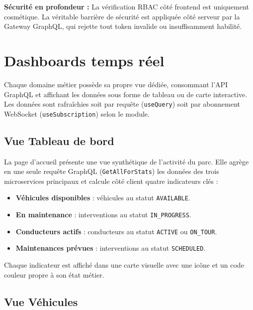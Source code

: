 \documentclass[12pt,a4paper]{article}
\begin{document}
\begin{infobox}
\textbf{S\'{e}curit\'{e} en profondeur :} La v\'{e}rification RBAC c\^{o}t\'{e} frontend est uniquement cosmétique. La v\'{e}ritable barrière de s\'{e}curit\'{e} est appliqu\'{e}e c\^{o}t\'{e} serveur par la Gateway GraphQL, qui rejette tout token invalide ou insuffisamment habilit\'{e}.
\end{infobox}

\section{Dashboards temps r\'{e}el}

Chaque domaine m\'{e}tier poss\`{e}de sa propre vue d\'{e}di\'{e}e, consommant l'API GraphQL et affichant les donn\'{e}es sous forme de tableau ou de carte interactive. Les donn\'{e}es sont rafra\^{i}chies soit par requ\^{e}te (\texttt{useQuery}) soit par abonnement WebSocket (\texttt{useSubscription}) selon le module.

\subsection{Vue Tableau de bord}

La page d'accueil pr\'{e}sente une vue synth\'{e}tique de l'activit\'{e} du parc. Elle agr\`{e}ge en une seule requ\^{e}te GraphQL (\texttt{GetAllForStats}) les donn\'{e}es des trois microservices principaux et calcule c\^{o}t\'{e} client quatre indicateurs cl\'{e}s :

\begin{itemize}[leftmargin=*]
  \item \textbf{V\'{e}hicules disponibles} : v\'{e}hicules au statut \texttt{AVAILABLE}.
  \item \textbf{En maintenance} : interventions au statut \texttt{IN\_PROGRESS}.
  \item \textbf{Conducteurs actifs} : conducteurs au statut \texttt{ACTIVE} ou \texttt{ON\_TOUR}.
  \item \textbf{Maintenances pr\'{e}vues} : interventions au statut \texttt{SCHEDULED}.
\end{itemize}

Chaque indicateur est affich\'{e} dans une carte visuelle avec une ic\^{o}ne et un code couleur propre \`{a} son \'{e}tat m\'{e}tier.

\subsection{Vue V\'{e}hicules}
\end{document}

